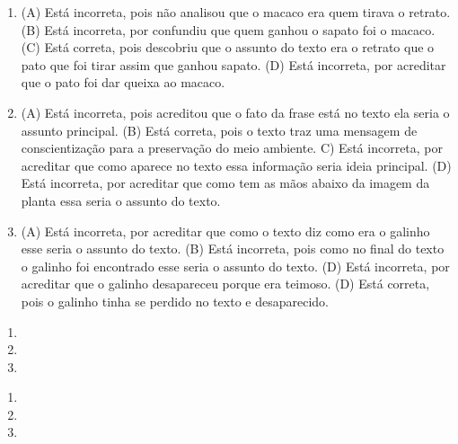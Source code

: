 
\begin{enumerate}
\item
(A) Está incorreta, pois não analisou que o macaco era quem tirava o retrato.
(B) Está incorreta, por confundiu que quem ganhou o sapato foi o macaco.
(C) Está correta, pois descobriu que o assunto do texto era o retrato
que o pato que foi tirar assim que ganhou sapato.
(D) Está incorreta, por acreditar que o pato foi dar queixa ao macaco.

\item
(A) Está incorreta, pois acreditou que o fato da frase está no texto ela
seria o assunto principal.
(B) Está correta, pois o texto traz uma mensagem de conscientização para
a preservação do meio ambiente.
C) Está incorreta, por acreditar que como aparece no texto essa
informação seria ideia principal.
(D) Está incorreta, por acreditar que como tem as mãos abaixo da imagem
da planta essa seria o assunto do texto.

\item
(A) Está incorreta, por acreditar que como o texto diz como era o
galinho esse seria o assunto do texto.
(B) Está incorreta, pois como no final do texto o galinho foi encontrado
esse seria o assunto do texto.
(D) Está incorreta, por acreditar que o galinho desapareceu porque era
teimoso.
(D) Está correta, pois o galinho tinha se perdido no texto e
desaparecido.
\end{enumerate}


\begin{enumerate}
\item

\item

\item
\end{enumerate}


\begin{enumerate}
\item

\item

\item
\end{enumerate}